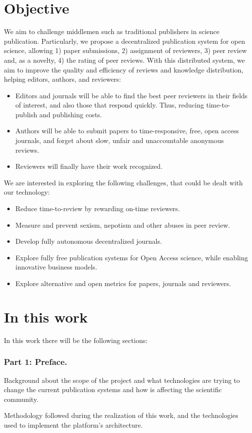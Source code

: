 \section{Objective}

We aim to challenge middlemen such as traditional publishers in science
publication. Particularly, we propose a decentralized publication system for
open science, allowing 1) paper submissions, 2) assignment of reviewers, 3) peer
review and, as a novelty, 4) the rating of peer reviews. With this distributed
system, we aim to improve the quality and efficiency of reviews and knowledge
distribution, helping editors, authors, and reviewers:
\begin{itemize}
\item Editors and journals will be able to find the best peer reviewers in their
  fields of interest, and also those that respond quickly. Thus, reducing
  time-to-publish and publishing costs.
\item Authors will be able to submit papers to time-responsive, free, open
  access journals, and forget about slow, unfair and unaccountable anonymous
  reviews.
\item Reviewers will finally have their work recognized.
\end{itemize}

We are interested in exploring the following challenges, that could be dealt
with our technology:
\begin{itemize}
\item Reduce time-to-review by rewarding on-time reviewers.
\item Measure and prevent sexism, nepotism and other abuses in peer review.
\item Develop fully autonomous decentralized journals.
\item Explore fully free publication systems for Open Access science, while
  enabling innovative business models.
\item Explore alternative and open metrics for papers, journals and reviewers.
\end{itemize}

  \section{In this work}
  In this work there will be the following sections:

  \subsubsection*{Part 1: Preface.}
  \begin{itemize}
     Background about the scope of the
    project and what technologies are trying to change the current publication
    systems and how is affecting the scientific community.

    Methodology followed during the
    realization of this work, and the technologies used to implement the
    platform's architecture.
  \end{itemize}
